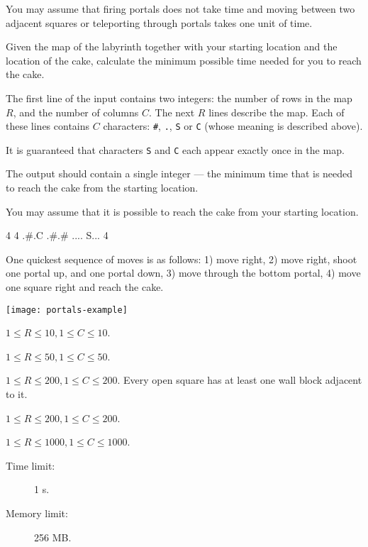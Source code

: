 \documentclass{boi2014}
\newcommand{\constant}[1]{{\tt #1}}
\begin{document}
    You may assume that firing portals does not take time and moving between two
    adjacent squares or teleporting through portals takes one unit of time.

    \Task
    Given the map of the labyrinth together with your starting location
    and the location of the cake, calculate the minimum possible time needed
    for you to reach the cake.

    \Input
    The first line of the input contains two integers: the number of rows
    in the map $R$, and the number of columns $C$. The next $R$ lines describe
    the map. Each of these lines contains $C$ characters: \constant{\#},
    \constant{.}, \constant{S} or \constant{C} (whose meaning is described
    above).

    It is guaranteed that characters \constant{S} and \constant{C} each appear
    exactly once in the map.

    \Output
    The output should contain a single integer --- the minimum time that
    is needed to reach the cake from the starting location.

    You may assume that it is possible to reach the cake from your
    starting location.

    \Example
    \example
    {
        4 4\newline
        .\#.C\newline
        .\#.\#\newline
        ....\newline
        S...
    }
    {
        4
    }
    {
        One quickest sequence of moves is as follows: 1) move right, 2) move
        right, shoot one portal up, and one portal down, 3) move through the
        bottom portal, 4) move one square right and reach the cake.

        \begin{center}
            \texttt{[image: portals-example]}
        \end{center}
    }

    \Scoring

    \begin{description}[leftmargin=0pt]
        \item[Subtask 1 (? points):] $1 \le R \le 10, 1 \le C \le 10$.
        \item[Subtask 2 (? points):] $1 \le R \le 50, 1 \le C \le 50$.
        \item[Subtask 3 (? points):] $1 \le R \le 200, 1 \le C \le 200$.
        Every open square has at least one wall block adjacent to it.
        \item[Subtask 4 (? points):] $1 \le R \le 200, 1 \le C \le 200$.
        \item[Subtask 5 (? points):] $1 \le R \le 1000, 1 \le C \le 1000$.
    \end{description}

    \Constraints

    \begin{description}
        \item[Time limit:] 1 s.
        \item[Memory limit:] 256 MB.
    \end{description}
\end{document}
